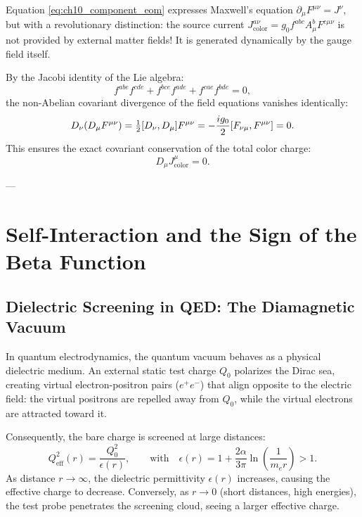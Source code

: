 Equation \eqref{eq:ch10_component_eom} expresses Maxwell's equation $\partial_\mu F^{\mu\nu} = J^\nu$, but with a revolutionary distinction: the source current $J_{\mathrm{color}}^{a\nu} = g_0 f^{abc} A_\mu^b F^{c\mu\nu}$ is not provided by external matter fields! It is generated dynamically by the gauge field itself.

By the Jacobi identity of the Lie algebra:
\begin{equation}
f^{abe} f^{cde} + f^{bce} f^{ade} + f^{cae} f^{bde} = 0,
\end{equation}
the non-Abelian covariant divergence of the field equations vanishes identically:
\begin{equation}
D_\nu (D_\mu F^{\mu\nu}) = \tfrac{1}{2} [D_\nu, D_\mu] F^{\mu\nu} = -\frac{i g_0}{2} [F_{\nu\mu}, F^{\mu\nu}] = 0.
\end{equation}
This ensures the exact covariant conservation of the total color charge:
\begin{equation}
D_\mu J_{\mathrm{color}}^\mu = 0.
\end{equation}

---

\section{Self-Interaction and the Sign of the Beta Function}
\label{sec:selfint_beta_sign}

\subsection{Dielectric Screening in QED: The Diamagnetic Vacuum}
\label{subsec:screening_qed}

In quantum electrodynamics, the quantum vacuum behaves as a physical dielectric medium. An external static test charge $Q_0$ polarizes the Dirac sea, creating virtual electron-positron pairs ($e^+ e^-$) that align opposite to the electric field: the virtual positrons are repelled away from $Q_0$, while the virtual electrons are attracted toward it. 

Consequently, the bare charge is screened at large distances:
\begin{equation}
\label{eq:ch10_qed_dielectric}
Q_{\mathrm{eff}}^2(r) = \frac{Q_0^2}{\epsilon(r)}, \qquad \text{with} \quad \epsilon(r) = 1 + \frac{2\alpha}{3\pi} \ln\left(\frac{1}{m_e r}\right) > 1.
\end{equation}
As distance $r \to \infty$, the dielectric permittivity $\epsilon(r)$ increases, causing the effective charge to decrease. Conversely, as $r \to 0$ (short distances, high energies), the test probe penetrates the screening cloud, seeing a larger effective charge. 

